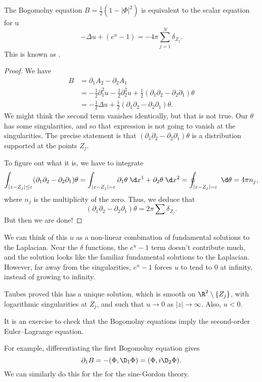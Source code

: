 \documentclass[a4paper]{article}
\begin{document}
\begin{thm}
  The Bogomolny equation $B = \frac{1}{2} (1 - |\Phi|^2)$ is equivalent to the scalar equation for u
  \[
    -\Delta u + (e^u - 1) = -4\pi \sum_{j = 1}^N \delta_{Z_j}.
  \]
  This is known as .
\end{thm}

\begin{proof}
  We have
  \begin{align*}
    B &= \partial_1 A_2 - \partial_2 A_1 \\
    &= -\frac{1}{2} \partial_1^2 u - \frac{1}{2} \partial_2^2 u + \frac{1}{2} (\partial_1 \partial_2 - \partial_2 \partial_1) \theta\\
    &= - \frac{1}{2} \Delta u + \frac{1}{2} (\partial_1 \partial_2 - \partial_2 \partial_1) \theta.
  \end{align*}
  We might think the second term vanishes identically, but that is not true. Our $\theta$ has some singularities, and so that expression is not going to vanish at the singularities. The precise statement is that $(\partial_1 \partial_2 - \partial_2 \partial_1) \theta$ is a distribution supported at the points $Z_j$.

  To figure out what it is, we have to integrate
  \[
    \int_{|z - Z_j| \leq \varepsilon} (\partial_1 \partial_2 - \partial_2 \partial_1) \theta = \int_{|z - Z_j| = \varepsilon} \partial_1 \theta \;\d x^1 + \partial_2 \theta \;\d x^2 = \oint_{|z - Z_j| = \varepsilon} \;\d \theta = 4\pi n_j,
  \]
  where $n_j$ is the multiplicity of the zero. Thus, we deduce that
  \[
    (\partial_1 \partial_2 - \partial_2 \partial_1) \theta = 2\pi \sum \delta_{Z_j}.
  \]
  But then we are done!
\end{proof}
We can think of this $u$ as a non-linear combination of fundamental solutions to the Laplacian. Near the $\delta$ functions, the $e^u - 1$ term doesn't contribute much, and the solution looks like the familiar fundamental solutions to the Laplacian. However, far away from the singularities, $e^u - 1$ forces $u$ to tend to $0$ at infinity, instead of growing to infinity.

Taubes proved this has a unique solution, which is smooth on $\R^2 \setminus \{Z_j\}$, with logarithmic singularities at $Z_j$, and such that $u \to 0$ as $|z| \to \infty$. Also, $u < 0$.

It is an exercise to check that the Bogomolny equations imply the second-order Euler--Lagrange equation.

For example, differentiating the first Bogomolny equation gives
\[
  \partial_1 B = - (\Phi, \D_1 \Phi) = (\Phi, i \D_2 \Phi).
\]
We can similarly do this for the for the sine-Gordon theory.
\end{document}
